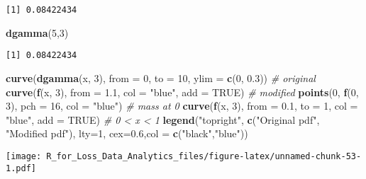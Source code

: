 \documentclass[]{book}
\newenvironment{Shaded}{\begin{snugshade}}{\end{snugshade}}
\newcommand{\KeywordTok}[1]{\textcolor[rgb]{0.13,0.29,0.53}{\textbf{#1}}}
\newcommand{\DataTypeTok}[1]{\textcolor[rgb]{0.13,0.29,0.53}{#1}}
\newcommand{\DecValTok}[1]{\textcolor[rgb]{0.00,0.00,0.81}{#1}}
\newcommand{\FloatTok}[1]{\textcolor[rgb]{0.00,0.00,0.81}{#1}}
\newcommand{\StringTok}[1]{\textcolor[rgb]{0.31,0.60,0.02}{#1}}
\newcommand{\CommentTok}[1]{\textcolor[rgb]{0.56,0.35,0.01}{\textit{#1}}}
\newcommand{\OtherTok}[1]{\textcolor[rgb]{0.56,0.35,0.01}{#1}}
\newcommand{\NormalTok}[1]{#1}
\theoremstyle{definition}
\theoremstyle{definition}
\theoremstyle{definition}
\theoremstyle{remark}
\begin{document}
\begin{verbatim}
[1] 0.08422434
\end{verbatim}

\begin{Shaded}
\begin{Highlighting}[]
\KeywordTok{dgamma}\NormalTok{(}\DecValTok{5}\NormalTok{,}\DecValTok{3}\NormalTok{)}
\end{Highlighting}
\end{Shaded}

\begin{verbatim}
[1] 0.08422434
\end{verbatim}

\begin{Shaded}
\begin{Highlighting}[]
\KeywordTok{curve}\NormalTok{(}\KeywordTok{dgamma}\NormalTok{(x, }\DecValTok{3}\NormalTok{), }\DataTypeTok{from =} \DecValTok{0}\NormalTok{, }\DataTypeTok{to =} \DecValTok{10}\NormalTok{, }\DataTypeTok{ylim =} \KeywordTok{c}\NormalTok{(}\DecValTok{0}\NormalTok{, }\FloatTok{0.3}\NormalTok{)) }\CommentTok{# original}
\KeywordTok{curve}\NormalTok{(}\KeywordTok{f}\NormalTok{(x, }\DecValTok{3}\NormalTok{), }\DataTypeTok{from =} \FloatTok{1.1}\NormalTok{, }\DataTypeTok{col =} \StringTok{"blue"}\NormalTok{, }\DataTypeTok{add =} \OtherTok{TRUE}\NormalTok{) }\CommentTok{# modified}
\KeywordTok{points}\NormalTok{(}\DecValTok{0}\NormalTok{, }\KeywordTok{f}\NormalTok{(}\DecValTok{0}\NormalTok{, }\DecValTok{3}\NormalTok{), }\DataTypeTok{pch =} \DecValTok{16}\NormalTok{, }\DataTypeTok{col =} \StringTok{"blue"}\NormalTok{) }\CommentTok{# mass at 0}
\KeywordTok{curve}\NormalTok{(}\KeywordTok{f}\NormalTok{(x, }\DecValTok{3}\NormalTok{), }\DataTypeTok{from =} \FloatTok{0.1}\NormalTok{, }\DataTypeTok{to =} \DecValTok{1}\NormalTok{, }\DataTypeTok{col =} \StringTok{"blue"}\NormalTok{, }\DataTypeTok{add =} \OtherTok{TRUE}\NormalTok{) }\CommentTok{# 0 < x < 1}
\KeywordTok{legend}\NormalTok{(}\StringTok{"topright"}\NormalTok{, }\KeywordTok{c}\NormalTok{(}\StringTok{"Original pdf"}\NormalTok{, }\StringTok{"Modified pdf"}\NormalTok{), }\DataTypeTok{lty=}\DecValTok{1}\NormalTok{, }\DataTypeTok{cex=}\FloatTok{0.6}\NormalTok{,}\DataTypeTok{col =} \KeywordTok{c}\NormalTok{(}\StringTok{"black"}\NormalTok{,}\StringTok{"blue"}\NormalTok{))}
\end{Highlighting}
\end{Shaded}

\texttt{[image: R\_for\_Loss\_Data\_Analytics\_files/figure-latex/unnamed-chunk-53-1.pdf]}
\end{document}
